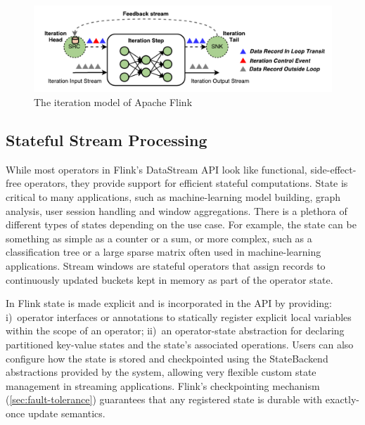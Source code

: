 \documentclass[11pt]{article}
\begin{document}
\begin{figure}[t!]
  \centering
    \includegraphics[width=.75\textwidth]{figs/iterations.pdf}
    \vspace{-6mm}
  \caption{The iteration model of Apache Flink}
  \vspace{-2mm}
  \label{fig:iterations}
\end{figure}

\vspace{-3mm}
\subsection{Stateful Stream Processing}
While most operators in Flink's DataStream API look like functional, side-effect-free operators, they provide support for efficient stateful computations. State is critical to many applications, such as machine-learning model building, graph analysis, user session handling and window aggregations. There is a plethora of different types of states depending on the use case. For example, the state can be something as simple as a counter or a sum, or more complex, such as a classification tree or a large sparse matrix often used in machine-learning applications. Stream windows are  stateful operators that assign records to continuously updated buckets kept in memory as part of the operator state. 

In Flink state is made explicit and is incorporated in the API by providing: i)~operator interfaces or annotations to statically register explicit local variables within the scope of an operator;  ii)~an operator-state abstraction for declaring partitioned key-value states and the state's associated operations. Users can also configure how the state is stored and checkpointed using the StateBackend abstractions provided by the system, allowing very flexible custom state management in streaming applications. Flink's checkpointing mechanism (\autoref{sec:fault-tolerance}) guarantees that any registered state is durable with exactly-once update semantics. 
\vspace{-8mm}

\end{document}

